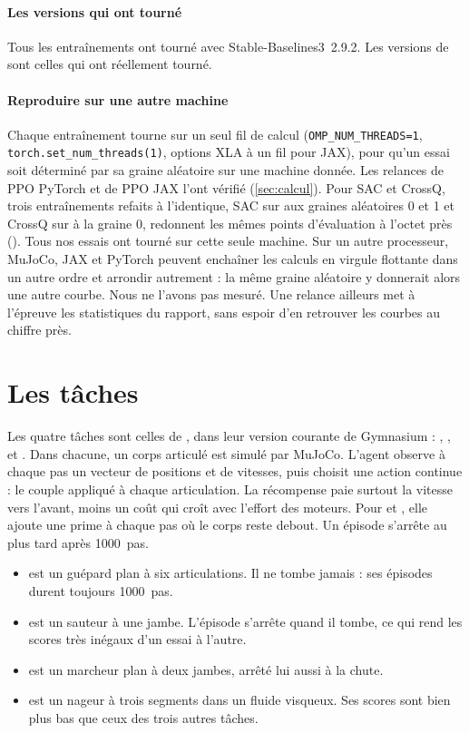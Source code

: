 \paragraph{Les versions qui ont tourné}
Tous les entraînements ont tourné avec Stable-Baselines3~2.9.2. Les versions de  sont
celles qui ont réellement tourné.

\paragraph{Reproduire sur une autre machine}
Chaque entraînement tourne sur un seul fil de calcul (\texttt{OMP\_NUM\_THREADS=1},
\texttt{torch.set\_num\_threads(1)}, options XLA à un fil pour JAX), pour qu'un essai soit déterminé par sa
graine aléatoire sur une machine donnée. Les relances de PPO PyTorch et de PPO JAX l'ont vérifié
(\cref{sec:calcul}). Pour SAC et CrossQ, trois entraînements refaits à l'identique, SAC sur 
aux graines aléatoires 0 et 1 et CrossQ sur  à la graine 0, redonnent les mêmes points
d'évaluation à l'octet près (). Tous nos essais ont tourné sur cette seule machine. Sur un
autre processeur, MuJoCo, JAX et PyTorch peuvent enchaîner les calculs en virgule flottante dans un autre ordre et
arrondir autrement : la même graine aléatoire y donnerait alors une autre courbe. Nous ne l'avons pas mesuré. Une
relance ailleurs met à l'épreuve les statistiques du rapport, sans espoir d'en retrouver les courbes au chiffre près.

\section{Les tâches}\label{sec:taches}

Les quatre tâches sont celles de \textcite{henderson2018matters}, dans leur version courante de Gymnasium :
, ,  et . Dans chacune, un corps
articulé est simulé par MuJoCo. L'agent observe à chaque pas un vecteur de positions et de vitesses, puis
choisit une action continue : le couple appliqué à chaque articulation. La récompense paie surtout la vitesse
vers l'avant, moins un coût qui croît avec l'effort des moteurs. Pour  et , elle
ajoute une prime à chaque pas où le corps reste debout. Un épisode s'arrête au plus tard après
\num{1000}~pas.
\begin{itemize}
  \item {} est un guépard plan à six articulations. Il ne tombe jamais : ses épisodes
    durent toujours \num{1000}~pas.
  \item {} est un sauteur à une jambe. L'épisode s'arrête quand il tombe, ce qui rend les scores
    très inégaux d'un essai à l'autre.
  \item {} est un marcheur plan à deux jambes, arrêté lui aussi à la chute.
  \item {} est un nageur à trois segments dans un fluide visqueux. Ses scores sont bien plus bas
    que ceux des trois autres tâches.
\end{itemize}

